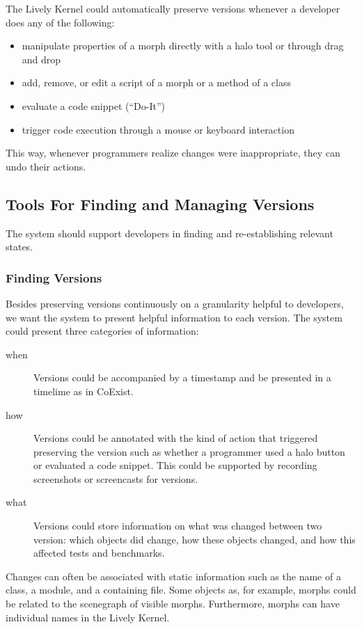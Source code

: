 The Lively Kernel could automatically preserve versions whenever a developer does any of the following:
\begin{itemize}
    \item manipulate properties of a morph directly with a halo tool or through drag and drop
    \item add, remove, or edit a script of a morph or a method of a class
    \item evaluate a code snippet (``Do-It'')
    \item trigger code execution through a mouse or keyboard interaction
\end{itemize}

This way, whenever programmers realize changes were inappropriate, they can undo their actions.


\subsection{Tools For Finding and Managing Versions}

The system should support developers in finding and re-establishing relevant states.

\subsubsection{Finding Versions}

Besides preserving versions continuously on a granularity helpful to developers, we want the system to present helpful information to each version.
The system could present three categories of information:

\begin{description}
    \item[when] Versions could be accompanied by a timestamp and be presented in a timelime as in CoExist.
    \item[how] Versions could be annotated with the kind of action that triggered preserving the version such as whether a programmer used a halo button or evaluated a code snippet. This could be supported by recording screenshots or screencasts for versions.
    \item[what] Versions could store information on what was changed between two version: which objects did change, how these objects changed, and how this affected tests and benchmarks.
\end{description}

Changes can often be associated with static information such as the name of a class, a module, and a containing file.
Some objects as, for example, morphs could be related to the scenegraph of visible morphs.
Furthermore, morphs can have individual names in the Lively Kernel.

